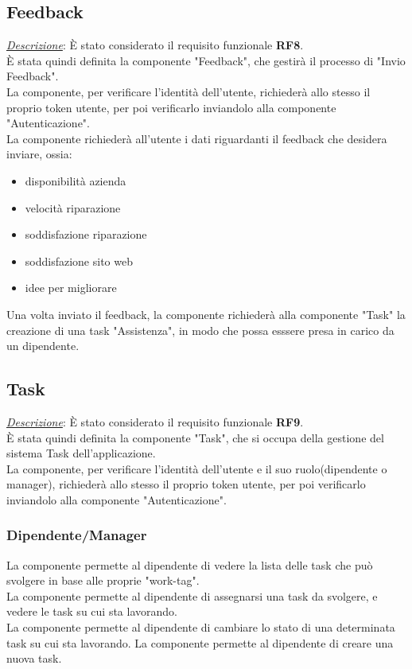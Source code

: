 \documentclass{report}
\begin{document}
\subsection*{Feedback}
\uline{\textit{Descrizione}}:
È stato considerato il requisito funzionale \textbf{RF8}.\\
È stata quindi definita la componente "Feedback", che gestirà il processo di "Invio Feedback".\\
La componente, per verificare l'identità dell'utente, richiederà allo stesso il proprio token utente, per poi verificarlo inviandolo alla componente "Autenticazione".\\
La componente richiederà all'utente i dati riguardanti il feedback che desidera inviare, ossia:
\begin{itemize}
	\item disponibilità azienda
	\item velocità riparazione
	\item soddisfazione riparazione
	\item soddisfazione sito web
	\item idee per migliorare
\end{itemize}
Una volta inviato il feedback, la componente richiederà alla componente "Task" la creazione di una task "Assistenza",
in modo che possa esssere presa in carico da un dipendente.

\subsection*{Task}
\uline{\textit{Descrizione}}:
È stato considerato il requisito funzionale \textbf{RF9}.\\
È stata quindi definita la componente "Task", che si occupa della gestione del sistema Task dell'applicazione.\\
La componente, per verificare l'identità dell'utente e il suo ruolo(dipendente o manager), richiederà allo stesso il proprio token utente, per poi verificarlo inviandolo alla componente "Autenticazione".\\

\subsubsection*{Dipendente/Manager}
La componente permette al dipendente di vedere la lista delle task che può svolgere in base alle proprie "work-tag".\\
La componente permette al dipendente di assegnarsi una task da svolgere, e vedere le task su cui sta lavorando.\\
La componente permette al dipendente di cambiare lo stato di una determinata task su cui sta lavorando.
La componente permette al dipendente di creare una nuova task.
\end{document}
